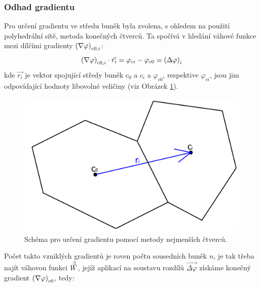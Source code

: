         \subsubsection{Odhad gradientu} \label{sec:odhad-gradientu}
            Pro určení gradientu ve středu buněk byla zvolena, s ohledem na použití polyhedrální sítě, metoda konečných čtverců. Ta spočívá v hledání váhové funkce mezi dílčími gradienty $\left( \nabla \varphi \right)_{c0,i}$:
            \begin{equation}
                \left( \nabla \varphi \right)_{c0,i} \cdot \Vec{r_i} = \varphi _{ci} - \varphi _{c0} = \left( \Delta \varphi \right) _i
            \end{equation}
            \noindent kde $\Vec{r_i}$ je vektor spojující středy buněk $c_0$ a $c_i$ a $\varphi _{c0}$, respektive $\varphi _{ci}$, jsou jim odpovídající hodnoty libovolné veličiny (viz Obrázek \ref{fig:urceni-gradientu}). 
            \begin{figure}[ht!]
                \centering
                \includegraphics[width=.75\textwidth]{300_VYPOCETNI_MODEL/urceni_gradientu.png}
                \caption{Schéma pro určení gradientu pomocí metody nejmenších čtverců.}
                \label{fig:urceni-gradientu}
            \end{figure}
            Počet takto vzniklých gradientů je roven počtu sousedních buněk $n$, je tak třeba najít váhovou funkci $\Vec{\Vec{W}}$, jejíž aplikací na soustavu rozdílů $\Vec{\Delta \varphi}$ získáme konečný gradient $\left( \nabla \varphi \right) _{c0}$, tedy:
